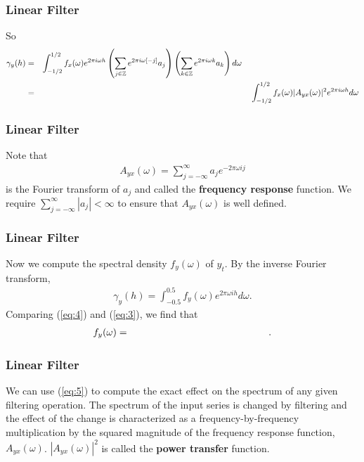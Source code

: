 \documentclass[%
xcolor=pdftex]{beamer}
\begin{document}
\begin{frame}
\frametitle{Linear Filter}

So
\begin{eqnarray} \label{eq:3}
\gamma_y(h) &=& \int_{-1/2}^{1/2} f_x (\omega) e^{2\pi i \omega h }\left(\sum_{j \in \mathbb{Z} } e^{2\pi i \omega [-j]} a_j \right) \left(\sum_{k \in \mathbb{Z} } e^{2\pi i \omega k}a_k \right) d \omega \hspace{50mm} \nonumber \\
            &=& \int_{-1/2}^{1/2} f_x(\omega) |A_{yx}(\omega)|^2  e^{2\pi i \omega h } d\omega  
\end{eqnarray}

\end{frame}



\begin{frame}
\frametitle{Linear Filter}

Note that
\begin{eqnarray} \label{eq:res}
A_{yx}(\omega) = \sum^\infty_{j=-\infty} a_j e^{-2\pi \omega i j}
\end{eqnarray}
is the Fourier transform of $a_j$ and called the {\bf frequency
response} function. We require $\sum^\infty_{j=-\infty}|a_j|<\infty$ to ensure that
$A_{yx}(\omega)$ is well defined.

\end{frame}

\begin{frame}
\frametitle{Linear Filter}

Now we compute the spectral density $f_y(\omega)$ of $y_t$. By
the inverse Fourier transform,
\begin{eqnarray}\label{eq:4}
\gamma_y(h)  = \int^{0.5}_{-0.5} f_y(\omega) e^{2\pi \omega i h}d\omega.
\end{eqnarray}
Comparing (\ref{eq:4}) and (\ref{eq:3}), we find that
\begin{eqnarray}\label{eq:5}
f_y(\omega)  =  \hspace{50mm}.
\end{eqnarray}


\end{frame}

\begin{frame}
\frametitle{Linear Filter}

We can use (\ref{eq:5}) to compute the exact effect on the spectrum of any given filtering operation. The spectrum of the input series is changed by filtering and the effect of the change is characterized as a frequency-by-frequency multiplication by the squared magnitude of the frequency response function, $A_{yx}(\omega)$. $|A_{yx}(\omega)|^2$ is called the \textbf{power transfer} function.

\end{frame}
\end{document}
